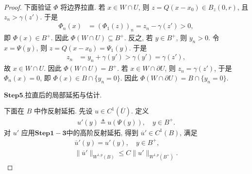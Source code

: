 \documentclass[../../main.tex]{subfiles}%
\begin{document}
\begin{proof}
下面验证 \(\Phi\) 将边界拉直. 若 \(x \in W \cap U\), 则 \(z = Q(x - x_0) \in B_z(0, r)\), 且 \(z_n > \gamma(z')\). 于是
\begin{align*}
\Phi_n(x) &= (\Phi_1(z))_n = z_n - \gamma(z') > 0,
\end{align*}
即 \(\Phi(x) \in B^+\). 因此 \(\Phi(W \cap U) \subseteq B^+\). 反之, 若 \(y \in B^+\), 则 \(y_n > 0\). 令 \(x = \Psi(y)\), 则 \(z = Q(x - x_0) = \Psi_1(y)\). 于是
\begin{align*}
z_n &= y_n + \gamma(y') > \gamma(y') = \gamma(z'),
\end{align*}
故 \(x \in W \cap U\). 因此 \(\Phi(W \cap U) = B^+\). 若 \(x \in W \cap \partial U\), 则 \(z_n = \gamma(z')\), 于是 \(\Phi_n(x) = 0\), 即 \(\Phi(x) \in B \cap \{y_n = 0\}\). 因此 \(\Phi(W \cap \partial U) = B \cap \{y_n = 0\}\).

\noindent$\mathbf{Step}\bm{5}$.{\heiti 拉直后的局部延拓与估计.}

下面在 \(B\) 中作反射延拓. 先设 \(u \in C^1(\overline{U})\). 定义
\begin{align*}
u'(y) \triangleq u(\Psi(y)), \quad y \in B^+.
\end{align*}
对 \(u'\) 应用$\mathbf{Step}\bm{1-3}$中的高阶反射延拓, 得到 \(\overline{u}' \in C^1(B)\), 满足
\begin{gather}
\overline{u}'(y) = u'(y), \quad y \in B^+, \label{eq:ch05-ext-in-ball-1} \\
\|\overline{u}'\|_{W^{1,p}(B)} \leqslant C \|u'\|_{W^{1,p}(B^+)}. \label{eq:ch05-ext-in-ball-2}
\end{gather}


\end{proof}
\end{document}
